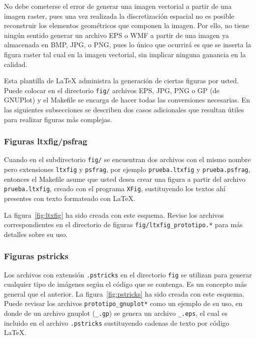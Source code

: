 No debe cometerse el error de generar una imagen vectorial a partir de una
imagen raster, pues una vez realizada la discretización espacial no es posible
reconstruir los elementos geométricos que componen la imagen. Por ello, no
tiene ningún sentido generar un archivo EPS o WMF a partir de una imagen ya
almacenada en BMP, JPG, o PNG, pues lo único que ocurrirá es que se inserta la
figura raster tal cual en la imagen vectorial, sin implicar ninguna ganancia en
la calidad.

Esta plantilla de LaTeX administra la generación de ciertas figuras por usted.
Puede colocar en el directorio \texttt{fig/} archivos EPS, JPG, PNG o GP (de
GNUPlot) y el Makefile se encarga de hacer todas las conversiones necesarias.
En las siguientes subsecciones se describen dos casos adicionales que resultan
útiles para realizar figuras más complejas.

\subsubsection{Figuras ltxfig/psfrag}

Cuando en el subdirectorio \texttt{fig/} se encuentran dos archivos con el
mismo nombre pero extensiones \texttt{ltxfig} y \texttt{psfrag}, por ejemplo
\texttt{prueba.ltxfig} y \texttt{prueba.psfrag}, entonces el Makefile asume que
usted desea crear una figura a partir del archivo \texttt{prueba.ltxfig},
creado con el programa \texttt{XFig}, sustituyendo los textos ahí presentes con
texto formateado con LaTeX.

La figura~\ref{fig:ltxfig} ha sido creada con este esquema.  Revise los
archivos correspondientes en el directorio de figuras
\texttt{fig/ltxfig\_prototipo.*} para más detalles sobre su uso.


\subsubsection{Figuras pstricks}  

Los archivos con extensión \texttt{.pstricks} en el directorio \texttt{fig} se
utilizan para generar cualquier tipo de imágenes según el código que se
contenga.  Es un concepto más general que el anterior.  La
figura~\ref{fig:pstricks} ha sido creada con este esquema.  Puede revisar los
archivos \texttt{prototipo\_gnuplot*} como un ejemplo de su uso, en donde de un
archivo gnuplot (\texttt{\_.gp}) se genera un archivo \texttt{\_.eps}, el cual
es incluido en el archivo \texttt{.pstricks} sustituyendo cadenas de texto por
código LaTeX.

